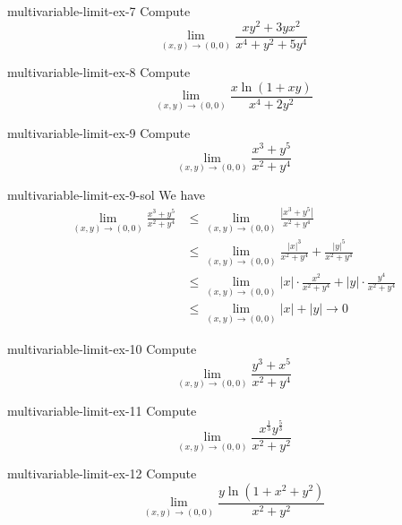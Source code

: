 \documentclass[preview]{standalone}
\begin{document}
\begin{snippetexercise}{multivariable-limit-ex-7}{}
    Compute
    \[
        \lim_{(x, y) \rightarrow(0,0)} \frac{xy^2 + 3yx^2}{x^4 + y^2 + 5y^4}
    \]
\end{snippetexercise}

\begin{snippetexercise}{multivariable-limit-ex-8}{}
    Compute
    \[
        \lim_{(x, y) \rightarrow(0,0)} \frac{x \ln(1 + xy)}{x^4 + 2y^2}
    \]
\end{snippetexercise}

\begin{snippetexercise}{multivariable-limit-ex-9}{}
    Compute
    \[
        \lim_{(x, y) \rightarrow(0,0)} \frac{x^3 + y^5}{x^2 + y^4}
    \]
\end{snippetexercise}

\begin{snippetsolution}{multivariable-limit-ex-9-sol}{}
    We have
    \begin{align*}
        \lim_{(x, y) \to (0,0)} \frac{x^3 + y^5}{x^2 + y^4}
        &\leq \lim_{(x, y) \to (0,0)} \frac{|x^3 + y^5|}{x^2 + y^4} \\
        &\leq \lim_{(x, y) \to (0,0)} \frac{{|x|}^3}{x^2 + y^4} + \frac{{|y|}^5}{x^2 + y^4} \\
        &\leq \lim_{(x, y) \to (0,0)}
            |x| \cdot \frac{x^2}{x^2 + y^4} +
            |y| \cdot \frac{y^4}{x^2 + y^4} \\
        &\leq \lim_{(x, y) \to (0,0)} |x| + |y| \to 0
    \end{align*}
\end{snippetsolution}

\begin{snippetexercise}{multivariable-limit-ex-10}{}
    Compute
    \[
        \lim_{(x, y) \rightarrow(0,0)} \frac{y^3 + x^5}{x^2 + y^4}
    \]
\end{snippetexercise}

\begin{snippetexercise}{multivariable-limit-ex-11}{}
    Compute
    \[
        \lim_{(x, y) \rightarrow(0,0)} \frac{x^{\frac{1}{3}}y^{\frac{5}{3}}}{x^2 + y^2}
    \]
\end{snippetexercise}

\begin{snippetexercise}{multivariable-limit-ex-12}{}
    Compute
    \[
        \lim_{(x, y) \rightarrow(0,0)} \frac{y \ln(1 + x^2 + y^2)}{x^2 + y^2}
    \]
\end{snippetexercise}
\end{document}
